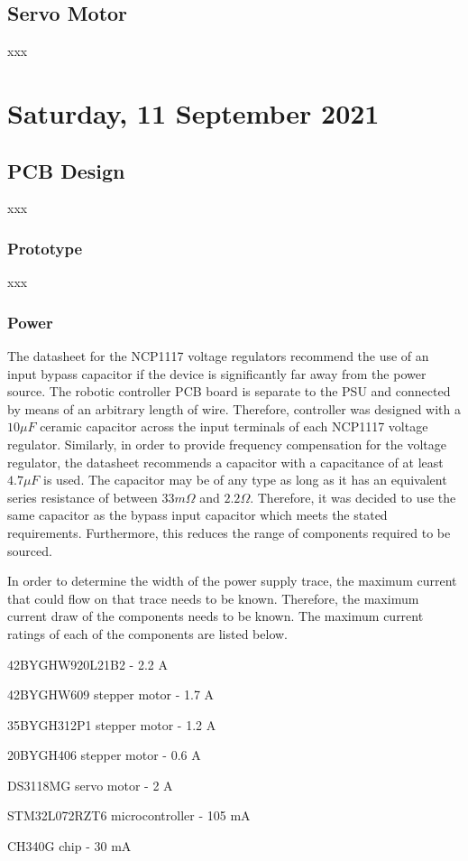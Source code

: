 \subsection{Servo Motor}
xxx




\pendsign

\section[2021/09/11]{Saturday, 11 September 2021}

\subsection{PCB Design}
xxx

\subsubsection{Prototype}
xxx


\subsubsection{Power}
The datasheet for the NCP1117 voltage regulators recommend the use of an input bypass capacitor if the device is significantly far away from the power source. The robotic controller PCB board is separate to the \ac{PSU} and connected by means of an arbitrary length of wire. Therefore, controller was designed with a $10\mu F$ ceramic 
capacitor across the input terminals of each NCP1117 voltage regulator. Similarly, in order to provide frequency compensation for the voltage regulator, the datasheet recommends a capacitor with a capacitance of at least $4.7\mu F$ is used. The capacitor may be of any type as long as it has an equivalent series resistance of between $33m\Omega$ and $2.2\Omega$. Therefore, it was decided to use the same capacitor as the bypass input capacitor which meets the stated requirements. Furthermore, this reduces the range of components required to be sourced.

In order to determine the width of the power supply trace, the maximum current that could flow on that trace needs to be known. Therefore, the maximum current draw of the components needs to be known. The maximum current ratings of each of the components are listed below.

\begin{compactitem}
	\item 42BYGHW920L21B2 - 2.2 A
	\item 42BYGHW609 stepper motor - 1.7 A
	\item 35BYGH312P1 stepper motor - 1.2 A
	\item 20BYGH406 stepper motor - 0.6 A
	\item DS3118MG servo motor - 2 A
	\item STM32L072RZT6 microcontroller - 105 mA
	\item CH340G chip - 30 mA
\end{compactitem}

